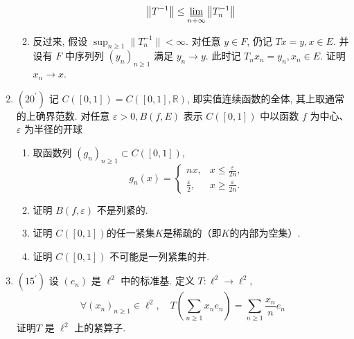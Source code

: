 \begin{enumerate}
\begin{enumerate}
            \[
            \left\|T^{-1}\right\| \leq \varliminf_{n+\infty}\left\|T_{n}^{-1}\right\|
            \]
            \item 反过来, 假设 $\sup _{n \geq 1} \| T_{n}^{-1} \|<\infty .$ 对任意 $y \in F$, 仍记 $T x=y, x \in E .$ 并设有 $F$ 中序列列 $\left(y_{n}\right)_{n \geq 1}$ 满足 $y_{n} \rightarrow y$. 此时记 $T_{n} x_{n}=y_{n}, x_{n} \in E .$ 证明 $x_{n} \to x$.
        \end{enumerate}
    \item $\left(20^{\prime}\right)$ 
    记 $C([0,1])=C([0,1], \mathbb{R})$, 即实值连续函数的全体, 其上取通常的上确界范数. 对任意 $\varepsilon>0, B(f, E)$ 表示 $C([0,1])$ 中以函数 $f$ 为中心、 $\varepsilon$ 为半径的开球
        \begin{enumerate}
            \item 取函数列 $\left(g_{n}\right)_{n \geq 1} \subset C([0,1])$,
            \[
            g_{n}(x)=\left\{\begin{array}{lll}
            n x, & x \leq \frac{\varepsilon}{2 n}, & \\
            \frac{\varepsilon}{2}, & x \geq \frac{\varepsilon}{2 n} .
            \end{array}\right.
            \]
            \item 证明 $B(f, \varepsilon)$ 不是列紧的.
            \item 证明 $C([0,1])$的任一紧集$K$是稀疏的（即$K$的内部为空集）.
            \item 证明 $C([0,1])$ 不可能是一列紧集的并.
        \end{enumerate}
    \item $\left(15^{\prime}\right)$ 
    设 $\left(e_{n}\right)$ 是 $\ell^{2}$ 中的标准基. 定义 $T: \ell^{2} \rightarrow \ell^{2}$,
    \[
    \forall\left(x_{n}\right)_{n \geq 1} \in \ell^{2}, \quad T\left(\sum_{n \geq 1} x_{n} e_{n}\right)=\sum_{n \geq 1} \frac{x_{n}}{n} e_{n}
    \]
    证明$T$ 是 $\ell^{2}$ 上的紧算子.
\end{enumerate}
